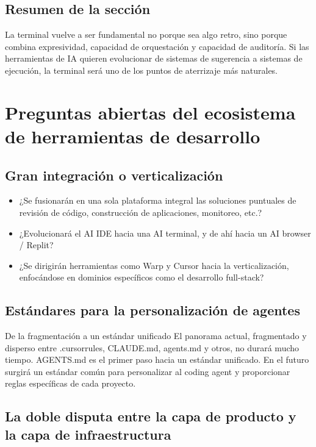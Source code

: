 \documentclass[a4paper]{article}
\begin{document}
\subsection{Resumen de la sección}

La terminal vuelve a ser fundamental no porque sea algo retro, sino porque combina expresividad, capacidad de orquestación y capacidad de auditoría. Si las herramientas de IA quieren evolucionar de sistemas de sugerencia a sistemas de ejecución, la terminal será uno de los puntos de aterrizaje más naturales.
\section{Preguntas abiertas del ecosistema de herramientas de desarrollo}

\subsection{Gran integración o verticalización}

\begin{itemize}
    \item ¿Se fusionarán en una sola plataforma integral las soluciones puntuales de revisión de código, construcción de aplicaciones, monitoreo, etc.?
    \item ¿Evolucionará el AI IDE hacia una AI terminal, y de ahí hacia un AI browser / Replit?
    \item ¿Se dirigirán herramientas como Warp y Cursor hacia la verticalización, enfocándose en dominios específicos como el desarrollo full-stack?
\end{itemize}

\subsection{Estándares para la personalización de agentes}

\begin{importantbox}{De la fragmentación a un estándar unificado}
El panorama actual, fragmentado y disperso entre .cursorrules, CLAUDE.md, agents.md y otros, no durará mucho tiempo. AGENTS.md es el primer paso hacia un estándar unificado. En el futuro surgirá un estándar común para personalizar al coding agent y proporcionar reglas específicas de cada proyecto.
\end{importantbox}

\subsection{La doble disputa entre la capa de producto y la capa de infraestructura}
\end{document}
